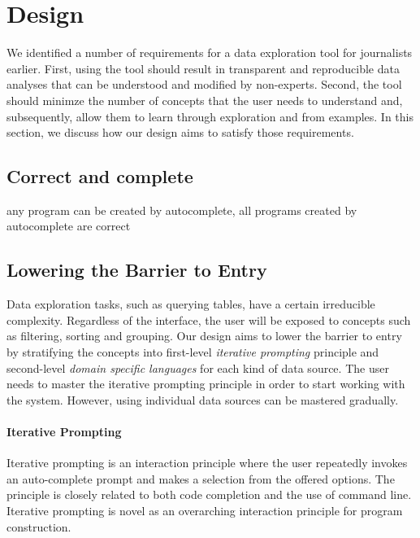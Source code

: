 \documentclass[manuscript,review,anonymous]{acmart}
\begin{document}

\section{Design}
\label{sec:design}

We identified a number of requirements for a data exploration tool for journalists earlier.
First, using the tool should result in transparent and reproducible data analyses that can be
understood and modified by non-experts. Second, the tool should minimze the number of concepts
that the user needs to understand and, subsequently, allow them to learn through exploration
and from examples. In this section, we discuss how our design aims to satisfy those requirements.

\subsection{Correct and complete}
any program can be created by autocomplete, all programs created by autocomplete are correct

\subsection{Lowering the Barrier to Entry}
Data exploration tasks, such as querying tables, have a certain irreducible complexity.
Regardless of the interface, the user will be exposed to concepts such as filtering,
sorting and grouping. Our design aims to lower the barrier to entry by stratifying the concepts
into first-level \emph{iterative prompting} principle and second-level \emph{domain specific
languages} for each kind of data source.
The user needs to master the iterative prompting principle in order to start working
with the system. However, using individual data sources can be mastered gradually.

\paragraph{Iterative Prompting}
Iterative prompting is an interaction principle where the user repeatedly invokes an
auto-complete prompt and makes a selection from the offered options. The principle is closely
related to both code completion and the use of command line. Iterative prompting is novel as an
overarching interaction principle for program construction.
\end{document}
